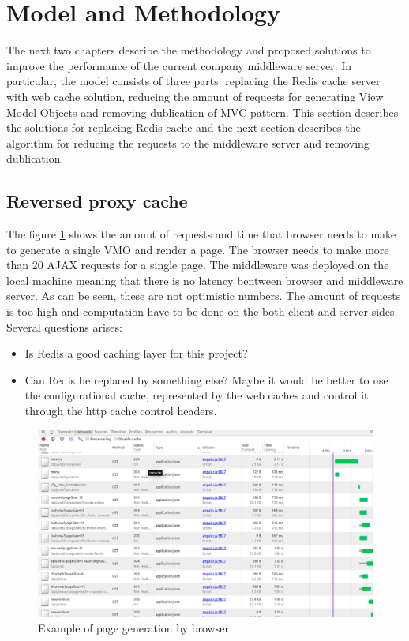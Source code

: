 \section{Model and Methodology}

The next two chapters describe the methodology and proposed solutions to improve the performance of the current company middleware server. In particular, the model consists of three parts: replacing the Redis cache server with web cache solution, reducing the amount of requests for generating View Model Objects and removing dublication of MVC pattern. This section describes the solutions for replacing Redis cache and the next section describes the algorithm for reducing the requests to the middleware server and removing dublication.

\subsection{Reversed proxy cache}

The figure \ref{fig:req_amount} shows the amount of requests and time that browser needs to make to generate a single VMO and  render a page. The browser needs to make more than 20 AJAX requests for a single page. The middleware was deployed on the local machine meaning that there is no latency bentween browser and middleware server. As can be seen, these are not optimistic numbers. The amount of requests is too high and computation have to be done on the both client and server sides. Several questions arises:
\begin{itemize}
	\item Is Redis a good caching layer for this project?
	\item Can Redis be replaced by something else? Maybe it would be better to use the configurational cache, represented by the web caches and control it through the http cache control headers.
\end{itemize}


\begin{figure}[h]
    \centering
	\includegraphics[width=\textwidth]{images/amount_of_requests.png}
    \caption{Example of page generation by browser}
    \label{fig:req_amount}
\end{figure}


